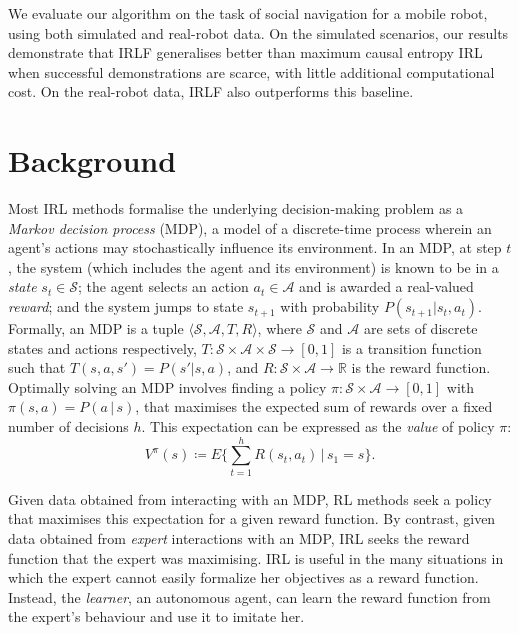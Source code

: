 \documentclass{aamas2016}
\newcommand{\jm}[1]{\textcolor{blue}{Joao: #1}}
\newcommand{\jm}[1]{}
\begin{document}
We evaluate our algorithm on the task of social navigation for a mobile robot, using both simulated and real-robot data. On the simulated scenarios, our results demonstrate that IRLF generalises better than maximum causal entropy IRL when successful demonstrations are scarce, with little additional computational cost.  On the real-robot data, IRLF also outperforms this baseline. 



\section{Background}
Most IRL methods formalise the underlying decision-making problem as a \emph{Markov decision process} (MDP), a model of a discrete-time process wherein an agent's actions may stochastically influence its environment. In an MDP, at step $t$, the system (which includes the agent and its environment) is known to be in a \emph{state} $s_t\in\mathcal{S}$; the agent selects an action $a_t\in\mathcal{A}$ and is awarded a real-valued \emph{reward}; and the system jumps to state $s_{t+1}$ with probability $P(s_{t+1}|s_t,a_t)$. Formally, an MDP is a tuple $\langle\mathcal{S},\mathcal{A},T,R\rangle$, where $\mathcal{S}$ and $\mathcal{A}$ are sets of discrete states and actions respectively, $T:\mathcal{S}\times\mathcal{A}\times\mathcal{S}\rightarrow [0,1]$ is a transition function such that $T(s,a,s')=P(s'|s,a)$, and $R:\mathcal{S}\times\mathcal{A}\rightarrow\mathbb R$ is the reward function. 
Optimally solving an MDP involves finding a policy $\pi:\mathcal{S}\times\mathcal{A}\rightarrow[0,1]$ with $\pi(s,a) = P(a\,|\,s)$, that maximises the expected sum of rewards over a fixed number of decisions $h$. This expectation can be expressed as the \emph{value} of policy $\pi$:
\begin{equation}
\label{eq:value}
 V^\pi(s) \coloneqq E\{\sum_{t = 1}^hR(s_t,a_t)\,\vert\, s_1 = s\}.
\end{equation}

Given data obtained from interacting with an MDP, RL methods seek a policy that maximises this expectation for a given reward function.  By contrast, given data obtained from \emph{expert} interactions with an MDP, IRL seeks the reward function that the expert was maximising.  IRL is useful in the many situations in which the expert cannot easily formalize her objectives as a reward function.  Instead, the \emph{learner}, an autonomous agent, can learn the reward function from the expert's behaviour and use it to imitate her.
\end{document}

